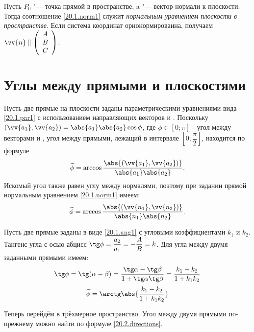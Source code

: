   Пусть $P_0$ "--- точка прямой в пространстве, a  "--- вектор нормали к плоскости. Тогда соотношение \eqref{20.1.norm1} служит \textit{нормальным уравнением плоскости в пространстве}. Если система координат орнонормированна, получаем $\vv{n}\parallel\left(\begin{array}{crl}
A\\
B\\
C\\
\end{array}\right)$.

\section{Углы между прямыми и плоскостями}

  Пусть две прямые на плоскости заданы параметрическими уравнениями вида \eqref{20.1.par1} с использованием направляющих векторов  и . Поскольку $(\vv{a_1},\vv{a_2})=\abs{a_1}\abs{a_2}\cos \phi$, где $\phi \in \left[0;\pi\right]$ - угол между векторами  и , угол между прямыми, лежащий в интервале $\left[0;\dfrac \pi 2\right]$, находится по формуле
  \begin{equation}\label{20.2.directions}
  \widetilde\phi=\arccos\dfrac{\abs{(\vv{a_1},\vv{a_2})}}{\abs{a_1}\abs{a_2}}.
  \end{equation}
  Искомый угол также равен углу между нормалями, поэтому при задании прямой нормальным уравнением \eqref{20.1.norm1} имеем:
  \begin{equation}\label{20.2.normals}
  \widetilde\phi=\arccos\dfrac{\abs{(\vv{n_1},\vv{n_2})}}{\abs{n_1}\abs{n_2}}.
  \end{equation}
  
  Пусть две прямые заданы в виде \eqref{20.1.ang1} с угловыми коэффициентами $k_1$ и $k_2$. Тангенс угла с осью абцисс $\tg \phi = \dfrac{a_2}{a_1}=-\dfrac{A}{B}=k$. Для угла между двумя заданными прямыми имеем:
  \begin{equation}
  \tg \phi=\tg (\alpha-\beta)=\dfrac{\tg \alpha - \tg \beta}{1+\tg \alpha \tg \beta}=\dfrac{k_1-k_2}{1+k_1k_2}
  \end{equation}
  \begin{equation}\label{20.2.angles}
  \widetilde \phi = \arctg \abs{\dfrac{k_1-k_2}{1+k_1k_2}}
  \end{equation}
  
  Теперь перейдём в трёхмерное пространство. Угол между двумя прямыми по-прежнему можно найти по формуле \eqref{20.2.directions}. 
  
